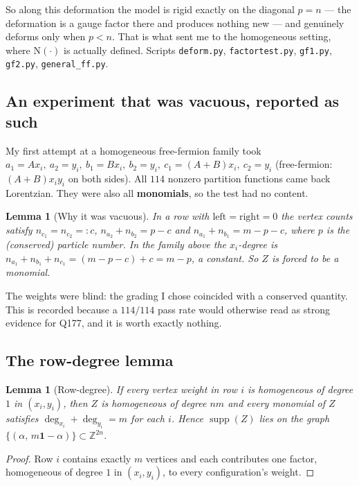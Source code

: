 \documentclass[11pt]{article}
\newtheorem{lemma}[theorem]{Lemma}
\theoremstyle{definition}
\newcommand{\N}{\mathrm{N}}
\newcommand{\Z}{\mathbb{Z}}
\newcommand{\supp}{\operatorname{supp}}
\begin{document}
So along this deformation the model is rigid exactly on the diagonal $p=n$ --- the
deformation is a gauge factor there and produces nothing new --- and genuinely deforms
only when $p<n$. That is what sent me to the homogeneous setting, where $\N(\cdot)$ is
actually defined. Scripts \texttt{deform.py}, \texttt{factortest.py}, \texttt{gf1.py},
\texttt{gf2.py}, \texttt{general\_ff.py}.

\subsection{An experiment that was vacuous, reported as such}

My first attempt at a homogeneous free-fermion family took
$a_1=Ax_i,\ a_2=y_i,\ b_1=Bx_i,\ b_2=y_i,\ c_1=(A+B)x_i,\ c_2=y_i$
(free-fermion: $(A+B)x_iy_i$ on both sides). All $114$ nonzero partition functions came
back Lorentzian. They were also all \textbf{monomials}, so the test had no content.

\begin{lemma}[Why it was vacuous]
In a row with $\mathrm{left}=\mathrm{right}=0$ the vertex counts satisfy
$n_{c_1}=n_{c_2}=:c$, $n_{a_2}+n_{b_2}=p-c$ and $n_{a_1}+n_{b_1}=m-p-c$, where $p$ is the
(conserved) particle number. In the family above the $x_i$-degree is
$n_{a_1}+n_{b_1}+n_{c_1}=(m-p-c)+c=m-p$, a constant. So $Z$ is forced to be a monomial.
\end{lemma}

The weights were blind: the grading I chose coincided with a conserved quantity. This is
recorded because a $114/114$ pass rate would otherwise read as strong evidence for Q177,
and it is worth exactly nothing.

\subsection{The row-degree lemma}

\begin{lemma}[Row-degree]\label{lem:rowdeg}
If every vertex weight in row $i$ is homogeneous of degree $1$ in $(x_i,y_i)$, then $Z$ is
homogeneous of degree $nm$ and every monomial of $Z$ satisfies
$\deg_{x_i}+\deg_{y_i}=m$ for each $i$. Hence $\supp(Z)$ lies on the graph
$\{(\alpha,\,m\mathbf{1}-\alpha)\}\subset\Z^{2n}$.
\end{lemma}

\begin{proof}
Row $i$ contains exactly $m$ vertices and each contributes one factor, homogeneous of
degree $1$ in $(x_i,y_i)$, to every configuration's weight.
\end{proof}
\end{document}
